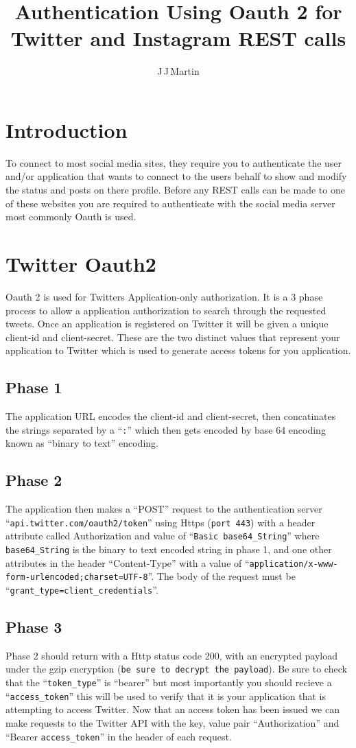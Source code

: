 \documentclass{article}
\title{Authentication Using Oauth 2 for Twitter and Instagram REST calls}
\author{J\,J\,Martin}
\begin{document}
\maketitle
\section{Introduction}
To connect to most social media sites, they require you to authenticate the user and/or application that wants to connect to the users behalf to show and modify the status and posts on there profile. Before any REST calls can be made to one of these websites you are required to authenticate with the social media server most commonly Oauth is used. 
\section{Twitter Oauth2}
Oauth 2 is used for Twitters Application-only authorization. It is a 3 phase process to allow a application authorization to search through the requested tweets. Once an application is registered on Twitter it will be given a unique client-id and client-secret. These are the two distinct values that represent your application to Twitter which is used to generate access tokens for you application.
\subsection{Phase 1}
The application URL encodes the client-id and client-secret, then concatinates the strings separated by a ``\verb+:+'' which then gets encoded by base 64 encoding known as ``binary to text'' encoding.
\subsection{Phase 2}
The application then makes a ``POST'' request to the authentication server ``\verb+api.twitter.com/oauth2/token+'' using Https (\verb+port 443+) with a header attribute called Authorization and value of ``\verb+Basic base64_String+'' where \verb+base64_String+ is the binary to text encoded string in phase 1, and one other attributes in the header ``Content-Type'' with a value of ``\verb+application/x-www-form-urlencoded;charset=UTF-8+''. The body of the request must be  ``\verb+grant_type=client_credentials+''.
\subsection{Phase 3}
Phase 2 should return with a Http status code 200, with an encrypted payload under the gzip encryption (\verb+be sure to decrypt the payload+). Be sure to check that the ``\verb+token_type+'' is ``bearer'' but most importantly you should recieve a ``\verb+access_token+'' this will be used to verify that it is your application that is attempting to access Twitter. Now that an access token has been issued we can make requests to the Twitter API with the key, value pair ``Authorization'' and ``Bearer \verb+access_token+'' in the header of each request. 
\end{document}
